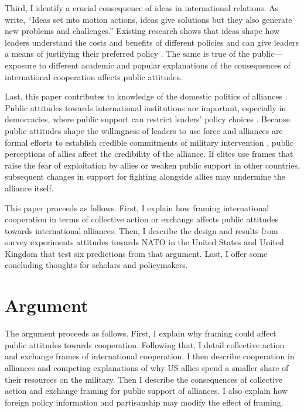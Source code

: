\documentclass[12pt]{article}
\begin{document}
Third, I identify a crucial consequence of ideas in international relations. 
As \citet[pg. 50]{BoettkeAligica2009} write, ``Ideas set into motion actions, ideas give solutions but they also generate new problems and challenges.''
Existing research shows that ideas shape how leaders understand the costs and benefits of different policies \citep{Morrison2012, Morrison2016} and can give leaders a means of justifying their preferred policy \citep{Parsons2002}.
The same is true of the public--- exposure to different academic and popular explanations of the consequences of international cooperation affects public attitudes.


Last, this paper contributes to knowledge of the domestic politics of alliances \citep{Lobell2004, Mattes2012a}.
Public attitudes towards international institutions are important, especially in democracies, where public support can restrict leaders' policy choices \citep{Putnam1988, Fearon1998, LevenduskyHorowitz2012, Williams2013, Levyetal2015}. 
Because public attitudes shape the willingness of leaders to use force \citep{Tomzetal2020} and alliances are formal efforts to establish credible commitments of military intervention \citep{Morrow2000}, public perceptions of allies affect the credibility of the alliance. 
If elites use frames that raise the fear of exploitation by allies or weaken public support in other countries, subsequent changes in support for fighting alongside allies may undermine the alliance itself.  


This paper proceeds as follows. 
First, I explain how framing international cooperation in terms of collective action or exchange affects public attitudes towards international alliances. 
Then, I describe the design and results from survey experiments attitudes towards NATO in the United States and United Kingdom that test six predictions from that argument. 
Last, I offer some concluding thoughts for scholars and policymakers. 



\section{Argument}



The argument proceeds as follows.  
First, I explain why framing could affect public attitudes towards cooperation.
Following that, I detail collective action and exchange frames of international cooperation. 
I then describe cooperation in alliances and competing explanations of why US allies spend a smaller share of their resources on the military.  
Then I describe the consequences of collective action and exchange framing for public support of alliances. 
I also explain how foreign policy information and partisanship may modify the effect of framing. 
\end{document}
